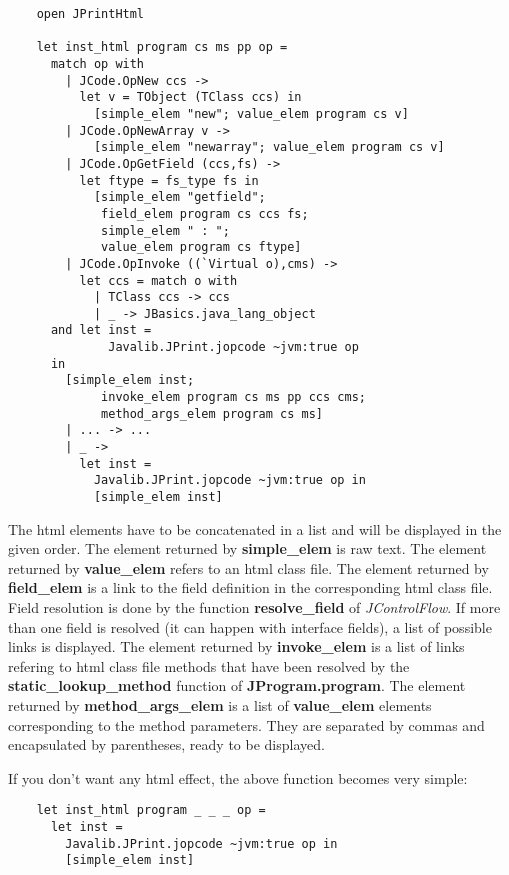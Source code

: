 \documentclass{article}
\begin{document}
\begin{verbatim}
    open JPrintHtml

    let inst_html program cs ms pp op =
      match op with
        | JCode.OpNew ccs ->
          let v = TObject (TClass ccs) in
            [simple_elem "new"; value_elem program cs v]
        | JCode.OpNewArray v ->
            [simple_elem "newarray"; value_elem program cs v]
        | JCode.OpGetField (ccs,fs) ->
          let ftype = fs_type fs in
            [simple_elem "getfield";
             field_elem program cs ccs fs;
             simple_elem " : ";
             value_elem program cs ftype]
        | JCode.OpInvoke ((`Virtual o),cms) ->
          let ccs = match o with
            | TClass ccs -> ccs
            | _ -> JBasics.java_lang_object 
      and let inst =
              Javalib.JPrint.jopcode ~jvm:true op 
      in
        [simple_elem inst;
             invoke_elem program cs ms pp ccs cms;
             method_args_elem program cs ms]
        | ... -> ...
        | _ ->
          let inst =
            Javalib.JPrint.jopcode ~jvm:true op in
            [simple_elem inst]
\end{verbatim}
The html elements have to be concatenated in a list and will be
displayed in the given order. The element returned by
\textbf{simple\_elem} is raw text. The element returned by
\textbf{value\_elem} refers to an html class file. The element
returned by \textbf{field\_elem} is a link to the field definition
in the corresponding html class file. Field resolution is done by
the function \textbf{resolve\_field} of \emph{JControlFlow}. If
more than one field is resolved (it can happen with interface
fields), a list of possible links is displayed. The element
returned by \textbf{invoke\_elem} is a list of links refering to
html class file methods that have been resolved by the
\textbf{static\_lookup\_method} function of
\textbf{JProgram.program}. The element returned by
\textbf{method\_args\_elem} is a list of \textbf{value\_elem}
elements corresponding to the method parameters. They are separated
by commas and encapsulated by parentheses, ready to be displayed.

If you don't want any html effect, the above function becomes very
simple:

\begin{verbatim}
    let inst_html program _ _ _ op =
      let inst =
        Javalib.JPrint.jopcode ~jvm:true op in
        [simple_elem inst]
\end{verbatim}
\end{document}
